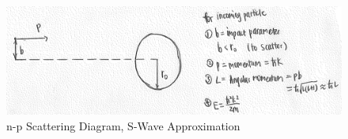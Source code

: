 \documentclass{school-22.101-notes}
\date{October 26, 2011}
\begin{document}
\maketitle

\begin{figure}[ht]
    \centering
    \includegraphics[width=6in]{images/scattering/np-scattering-diagram.png}
    \caption{n-p Scattering Diagram, S-Wave Approximation}
\end{figure}
\end{document}
